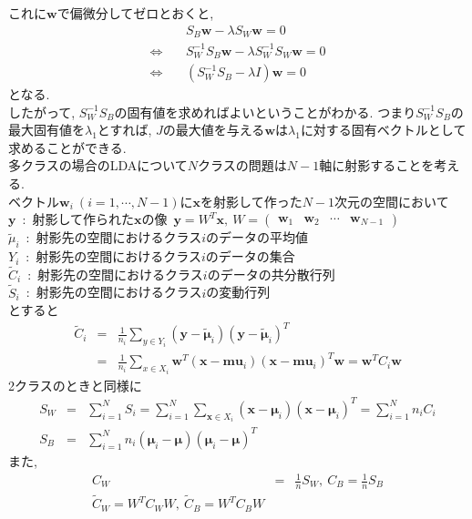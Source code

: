 \documentclass[dvipdfmx,a4j]{jsarticle}
\begin{document}
これに$\bm{w}$で偏微分してゼロとおくと,
\begin{eqnarray*}
    &&S_{B}\bm{w}-\lambda S_{W}\bm{w}=0\\
    \Longleftrightarrow\ && S_{W}^{-1}S_{B}\bm{w}-\lambda S_{W}^{-1}S_{W}\bm{w}=0\\
    \Longleftrightarrow\ && (S_{W}^{-1}S_{B}-\lambda I)\bm{w}=0
\end{eqnarray*}
となる.\\
したがって, $S_{W}^{-1}S_{B}$の固有値を求めればよいということがわかる. つまり$S_{W}^{-1}S_{B}$の最大固有値を$\lambda_{1}$とすれば, $J$の最大値を与える$\bm{w}$は$\lambda_{1}$に対する固有ベクトルとして求めることができる.\\[1cm]
多クラスの場合のLDAについて$N$クラスの問題は$N-1$軸に射影することを考える.\\
ベクトル$\bm{w}_{i}\ (i=1,\cdots,N-1)$に$\bm{x}$を射影して作った$N-1$次元の空間において\\
$\bm{y}$\ :\ 射影して作られた$\bm{x}$の像\ $\bm{y}=W^{T}\bm{x},\ W=\begin{pmatrix}\bm{w}_{1}&\bm{w}_{2}&\cdots&\bm{w}_{N-1}\end{pmatrix}$\\
$\tilde{\mu}_{i}$\ :\ 射影先の空間におけるクラス$i$のデータの平均値\\
$Y_{i}$\ :\ 射影先の空間におけるクラス$i$のデータの集合\\
$\tilde{C}_{i}$\ :\ 射影先の空間におけるクラス$i$のデータの共分散行列\\
$\tilde{S}_{i}$\ :\ 射影先の空間におけるクラス$i$の変動行列\\
とすると
\begin{eqnarray*}
    \tilde{C}_{i}&=&\frac{1}{n_{i}}\sum_{y\in Y_{i}}(\bm{y}-\tilde{\bm{\mu}}_{i})(\bm{y}-\tilde{\bm{\mu}}_{i})^{T}\\
                 &=&\frac{1}{n_{i}}\sum_{x\in X_{i}}\bm{w}^{T}(\bm{x}-\bm{mu}_{i})(\bm{x}-\bm{mu}_{i})^{T}\bm{w}=\bm{w}^{T}C_{i}\bm{w}
\end{eqnarray*}
2クラスのときと同様に
\begin{eqnarray*}
    S_{W}&=&\sum_{i=1}^{N}S_{i}=\sum_{i=1}^{N}\sum_{\bm{x}\in X_{i}}(\bm{x}-\bm{\mu}_{i})(\bm{x}-\bm{\mu}_{i})^{T}=\sum_{i=1}^{N}n_{i}C_{i}\\
    S_{B}&=&\sum_{i=1}^{N}n_{i}(\bm{\mu}_{i}-\bm{\mu})(\bm{\mu}_{i}-\bm{\mu})^{T}
\end{eqnarray*}
また,
\begin{eqnarray*}
    C_{W}&=&\frac{1}{n}S_{W},\ C_{B}=\frac{1}{n}S_{B}\\
    \tilde{C}_{W}=W^{T}C_{W}W,\ \tilde{C}_{B}=W^{T}C_{B}W
\end{eqnarray*}
\end{document}
